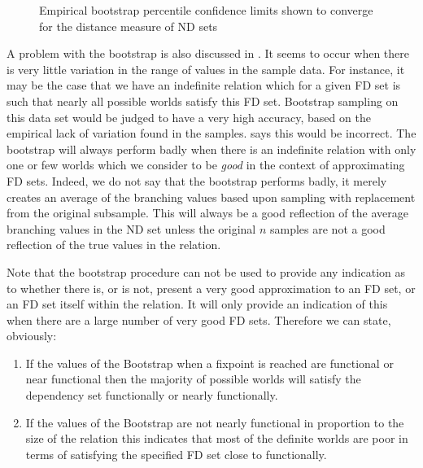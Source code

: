 \begin{figure}
\centerline{}
\caption{\label{graph:conlim} {Empirical bootstrap percentile
 confidence limits shown to converge for the distance measure of ND sets}}
\end{figure}


A problem with the bootstrap is also discussed in \cite{de83}. It
seems to occur when there is very little variation in the range
of values in the sample data. For instance, it may be the case that
we have an indefinite relation which for a given FD set is such that
nearly all possible worlds satisfy this FD set. Bootstrap sampling
on this data set would be judged to have a very high accuracy,
based on the empirical lack of variation found in the samples.
\cite{de83} says this would be incorrect. The bootstrap will always
perform badly when there is an indefinite relation
with only one or few worlds which we consider to be {\em good} in
the context of approximating FD sets.
Indeed, we do not say that the bootstrap performs badly, it merely
creates an average of the branching values based upon sampling with
replacement from the original subsample. This will always be a good
reflection of the average branching values in the ND set unless the
original $n$ samples are not a good reflection of the true values
in the relation.

Note that the bootstrap procedure can not be used to provide any
indication as to whether there is, or is not, present a very good
approximation to an FD set, or an FD set itself within the relation.
It will only provide an indication of this when there are a large 
number of very good FD sets. Therefore we can state, obviously:
\begin{enumerate}
\item If the values of the Bootstrap when a fixpoint is reached
are functional or near functional then the majority of possible
worlds will satisfy the dependency set functionally or nearly functionally.
\item If the values of the Bootstrap are not
nearly functional in proportion to the size of the relation this
indicates that most of the definite worlds are poor in terms of
satisfying the specified FD set close to functionally.
\end{enumerate} 

